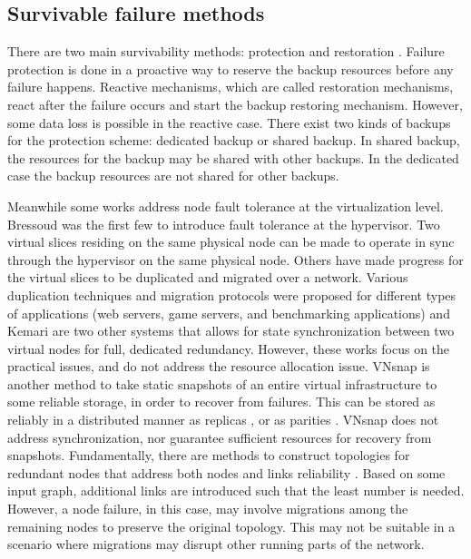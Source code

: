 \subsection{Survivable failure methods} There are two main survivability methods: protection and restoration \cite{ramamurthy2003survivable}. Failure protection is done in a proactive way to reserve the backup resources before any failure happens. Reactive mechanisms, which are called restoration mechanisms, react after the failure occurs and start the backup restoring mechanism. However, some data loss is possible in the reactive case. There exist two kinds of backups for the protection scheme: dedicated backup or shared backup. In shared backup, the resources for the backup may be shared with other backups. In the dedicated case the backup resources are not shared for other backups.

Meanwhile some works address node fault tolerance at the virtualization level. Bressoud \cite{bressoud1996hypervisor} was the first few to introduce fault tolerance at the hypervisor. Two virtual slices residing on the same physical node can be made to operate in sync through the hypervisor on the same physical node. Others \cite{wang2008virtual,cully2008remus} have made progress for the virtual slices to be duplicated and migrated over a network. Various duplication techniques and migration protocols were proposed for different types of applications (web servers, game servers, and benchmarking applications) \cite{wang2008virtual,cully2008remus} and Kemari \cite{tamura2008kemari} are two other systems that allows for state synchronization between two virtual nodes for full, dedicated
redundancy. However, these works focus on the practical issues, and do not address the resource allocation issue. VNsnap \cite{kangarlou2009vnsnap} is another method to take static snapshots of an entire virtual infrastructure to some reliable storage, in order to recover from failures. This can be stored as reliably
in a distributed manner as replicas \cite{chang2008bigtable}, or as parities \cite{dimakis2006decentralized,yeow2011highly}. VNsnap does not address synchronization, nor guarantee sufficient resources for recovery from snapshots. Fundamentally, there are methods to construct topologies for redundant nodes that address both nodes and links reliability \cite{ajtai1992fault,dutt1997node}. Based on some input graph, additional links are introduced such that the least number is needed. However, a node failure, in this case, may involve migrations among the remaining nodes to preserve the original topology. This may not be suitable in a scenario where migrations
may disrupt other running parts of the network.

